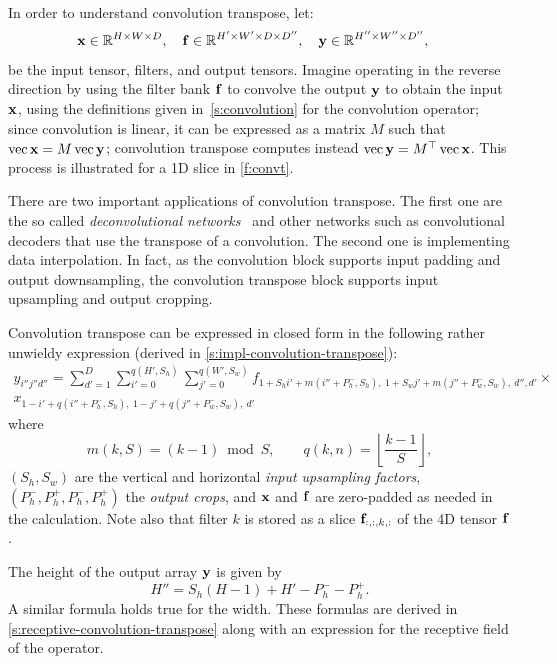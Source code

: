 In order to understand convolution transpose, let:
\[
 \mathbf{x}\in\mathbb{R}^{H \times W \times D}, \quad
 \mathbf{f}\in\mathbb{R}^{H' \times W' \times D \times D''}, \quad
 \mathbf{y}\in\mathbb{R}^{H'' \times W'' \times D''}, \quad
\]
be the input tensor, filters, and output tensors. Imagine operating in the reverse direction by using the filter bank $\mathbf{f}$ to convolve the output $\mathbf{y}$ to obtain the input $\mathbf{x}$, using the definitions given in~\cref{s:convolution} for the convolution operator; since convolution is linear, it can be expressed as a matrix $M$ such that  $\operatorname{vec} \mathbf{x} = M \operatorname{vec}\mathbf{y}$; convolution transpose computes instead $\operatorname{vec} \mathbf{y} = M^\top \operatorname{vec} \mathbf{x}$. This process is illustrated for a 1D slice in \cref{f:convt}.

There are two important applications of convolution transpose. The first one are the so called \emph{deconvolutional networks}~\cite{zeiler14visualizing} and other networks such as convolutional decoders that use the transpose of a convolution. The second one is implementing data interpolation. In fact, as the convolution block supports input padding and output downsampling, the convolution transpose block supports input upsampling and output cropping. 

Convolution transpose can be expressed in closed form in the following rather unwieldy expression (derived in \cref{s:impl-convolution-transpose}):
\begin{multline}\label{e:convt}
y_{i''j''d''} = 
 \sum_{d'=1}^{D}
 \sum_{i'=0}^{q(H',S_h)}
 \sum_{j'=0}^{q(W',S_w)}
f_{
1+ S_hi' + m(i''+ P_h^-, S_h),\ %
1+ S_wj' + m(j''+ P_w^-, S_w),\ %
d'',
d'
} 
\times \\
x_{
1 - i' + q(i''+P_h^-,S_h),\ %
1 - j' + q(j''+P_w^-,S_w),\ %
d'
}
\end{multline}
where
\[
m(k,S) = (k - 1) \bmod S,
\qquad
q(k,n) = \left\lfloor \frac{k-1}{S} \right\rfloor,
\]
$(S_h,S_w)$ are the vertical and horizontal \emph{input upsampling factors},  $(P_h^-,P_h^+,P_h^-,P_h^+)$ the \emph{output crops}, and $\mathbf{x}$ and $\mathbf{f}$ are zero-padded as needed in the calculation. Note also that filter $k$ is stored as a slice $\mathbf{f}_{:,:,k,:}$ of the 4D tensor $\mathbf{f}$.

The height of the output array $\mathbf{y}$ is given by
\[
  H'' = S_h (H - 1) + H' -P^-_h - P^+_h.
\]
A similar formula holds true for the width. These formulas are derived in \cref{s:receptive-convolution-transpose} along with an expression for the receptive field of the operator.

